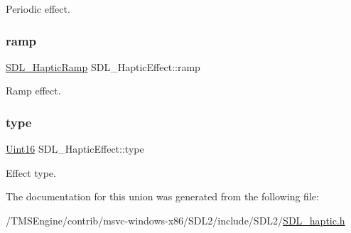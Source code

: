 Periodic effect. \mbox{\label{union_s_d_l___haptic_effect_a1d32ef4c2d1cc89dc938b392f6ad81bd}} 
\subsubsection{\texorpdfstring{ramp}{ramp}}
{\footnotesize\ttfamily \hyperlink{struct_s_d_l___haptic_ramp}{S\+D\+L\+\_\+\+Haptic\+Ramp} S\+D\+L\+\_\+\+Haptic\+Effect\+::ramp}

Ramp effect. \mbox{\label{union_s_d_l___haptic_effect_a5ff6cfd8da91537091e9a6c2108cb179}} 
\subsubsection{\texorpdfstring{type}{type}}
{\footnotesize\ttfamily \hyperlink{_s_d_l__stdinc_8h_a31fcc0a076c9068668173ee26d33e42b}{Uint16} S\+D\+L\+\_\+\+Haptic\+Effect\+::type}

Effect type. 

The documentation for this union was generated from the following file\+:\begin{DoxyCompactItemize}
\item 
/\+T\+M\+S\+Engine/contrib/msvc-\/windows-\/x86/\+S\+D\+L2/include/\+S\+D\+L2/\hyperlink{_s_d_l__haptic_8h}{S\+D\+L\+\_\+haptic.\+h}\end{DoxyCompactItemize}
